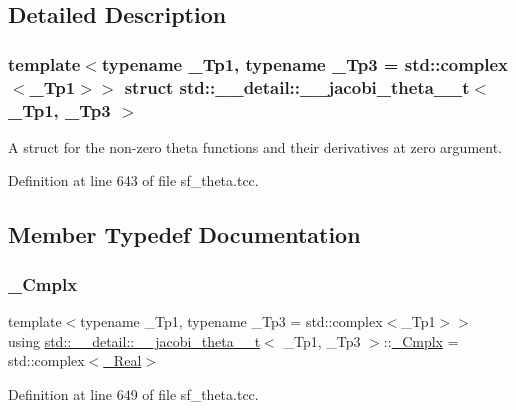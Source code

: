 \subsection{Detailed Description}
\subsubsection*{template$<$typename \+\_\+\+Tp1, typename \+\_\+\+Tp3 = std\+::complex$<$\+\_\+\+Tp1$>$$>$\newline
struct std\+::\+\_\+\+\_\+detail\+::\+\_\+\+\_\+jacobi\+\_\+theta\+\_\+\_\+t$<$ \+\_\+\+Tp1, \+\_\+\+Tp3 $>$}

A struct for the non-\/zero theta functions and their derivatives at zero argument. 

Definition at line 643 of file sf\+\_\+theta.\+tcc.



\subsection{Member Typedef Documentation}
\mbox{\label{structstd_1_1____detail_1_1____jacobi__theta__0__t_abe1df2c4f893fbb7c6fad023115f2fd6}} 
\subsubsection{\texorpdfstring{\+\_\+\+Cmplx}{\_Cmplx}}
{\footnotesize\ttfamily template$<$typename \+\_\+\+Tp1, typename \+\_\+\+Tp3 = std\+::complex$<$\+\_\+\+Tp1$>$$>$ \\
using \hyperlink{structstd_1_1____detail_1_1____jacobi__theta__0__t}{std\+::\+\_\+\+\_\+detail\+::\+\_\+\+\_\+jacobi\+\_\+theta\+\_\+\_\+t}$<$ \+\_\+\+Tp1, \+\_\+\+Tp3 $>$\+::\hyperlink{structstd_1_1____detail_1_1____jacobi__theta__0__t_abe1df2c4f893fbb7c6fad023115f2fd6}{\+\_\+\+Cmplx} =  std\+::complex$<$\hyperlink{structstd_1_1____detail_1_1____jacobi__theta__0__t_a1828d0b82b76cdf8281b0eabcfcfbaf9}{\+\_\+\+Real}$>$}



Definition at line 649 of file sf\+\_\+theta.\+tcc.

